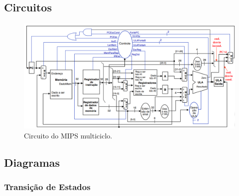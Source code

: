 \documentclass{article}
\begin{document}
        \subsection{Circuitos}

        \begin{figure}[H]
            \centering %
            \includegraphics[scale=0.35]{circuito_mips.png} %
            \caption{Circuito do MIPS multiciclo.}
            \label{figura:mips}
        \end{figure}

        \subsection{Diagramas}

        \subsubsection{Transição de Estados}
\end{document}
